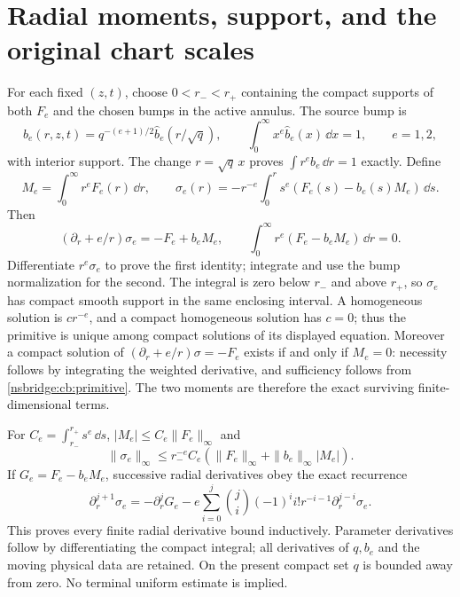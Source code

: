 \section{Radial moments, support, and the original chart scales}
For each fixed $(z,t)$, choose $0<r_-<r_+$ containing the compact
supports of both $F_e$ and the chosen bumps in the active annulus.
The source bump is
\[
 b_e(r,z,t)=q^{-(e+1)/2}\widehat b_e(r/\sqrt q),\qquad
 \int_0^\infty x^e\widehat b_e(x)\,\dd x=1,\qquad e=1,2,
\]
with interior support. The change $r=\sqrt q\,x$ proves
$\int r^eb_e\,\dd r=1$ exactly. Define
\begin{equation}
 M_e=\int_0^\infty r^eF_e(r)\,\dd r,\qquad
 \sigma_e(r)=-r^{-e}\int_0^r s^e(F_e(s)-b_e(s)M_e)\,\dd s .
 \label{nsbridge:cb:primitive}
\end{equation}
Then
\begin{equation}
 (\partial_r+e/r)\sigma_e=-F_e+b_eM_e,\qquad
 \int_0^\infty r^e(F_e-b_eM_e)\,\dd r=0. \label{nsbridge:cb:radial}
\end{equation}
Differentiate $r^e\sigma_e$ to prove the first identity; integrate and
use the bump normalization for the second. The integral is zero below
$r_-$ and above $r_+$, so $\sigma_e$ has compact smooth support in the
same enclosing interval. A homogeneous solution is $cr^{-e}$, and a
compact homogeneous solution has $c=0$; thus the primitive is unique
among compact solutions of its displayed equation. Moreover a compact
solution of $(\partial_r+e/r)\sigma=-F_e$ exists if and only if $M_e=0$:
necessity follows by integrating the weighted derivative, and
sufficiency follows from \eqref{nsbridge:cb:primitive}. The two moments are
therefore the exact surviving finite-dimensional terms.

For $C_e=\int_{r_-}^{r_+}s^e\,\dd s$,
$|M_e|\le C_e\|F_e\|_\infty$ and
\[
 \|\sigma_e\|_\infty\le r_-^{-e}C_e
        (\|F_e\|_\infty+\|b_e\|_\infty|M_e|).
\]
If $G_e=F_e-b_eM_e$, successive radial derivatives obey the exact recurrence
\[
 \partial_r^{j+1}\sigma_e=-\partial_r^jG_e
 -e\sum_{i=0}^j {j\choose i}(-1)^ii!r^{-i-1}
                              \partial_r^{j-i}\sigma_e .
\]
This proves every finite radial derivative bound inductively. Parameter
derivatives follow by differentiating the compact integral; all derivatives
of $q,b_e$ and the moving physical data are retained. On the present compact
set $q$ is bounded away from zero. No terminal uniform estimate is implied.

